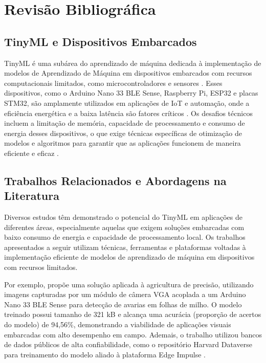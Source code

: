 \documentclass[repeatfields,xlists,xpacks,oneside]{ufrgscca}
\begin{document}
\chapter{Revisão Bibliográfica}

\section{TinyML e Dispositivos Embarcados}
TinyML é uma subárea do aprendizado de máquina dedicada à implementação de modelos de Aprendizado de Máquina em dispositivos embarcados com recursos computacionais limitados, como microcontroladores e sensores \cite{Kallimani2024}. Esses dispositivos, como o Arduino Nano 33 BLE Sense, Raspberry Pi, ESP32 e placas STM32, são amplamente utilizados em aplicações de IoT e automação, onde a eficiência energética e a baixa latência são fatores críticos \cite{Oliveira2024}. Os desafios técnicos incluem a limitação de memória, capacidade de processamento e consumo de energia desses dispositivos, o que exige técnicas específicas de otimização de modelos e algoritmos para garantir que as aplicações funcionem de maneira eficiente e eficaz \cite{Kallimani2024}.

\section{Trabalhos Relacionados e Abordagens na Literatura}
\label{sec:relacionados}
Diversos estudos têm demonstrado o potencial do TinyML em aplicações de diferentes áreas, especialmente aquelas que exigem soluções embarcadas com baixo consumo de energia e capacidade de processamento local. Os trabalhos apresentados a seguir utilizam técnicas, ferramentas e plataformas voltadas à implementação eficiente de modelos de aprendizado de máquina em dispositivos com recursos limitados.

Por exemplo, \cite{Wulnye2024} propõe uma solução aplicada à agricultura de precisão, utilizando imagens capturadas por um módulo de câmera VGA acoplada a um Arduino Nano 33 BLE Sense para detecção de avarias em folhas de milho. O modelo treinado possui tamanho de 321 kB e alcança uma acurácia (proporção de acertos do modelo) de 94,56\%, demonstrando a viabilidade de aplicações visuais embarcadas com alto desempenho em campo. Ademais, o trabalho utilizou bancos de dados públicos de alta confiabilidade, como o repositório Harvard Dataverse \cite{harvard_dataverse} para treinamento do modelo aliado à plataforma Edge Impulse \cite{edge_impulse}.
\end{document}
